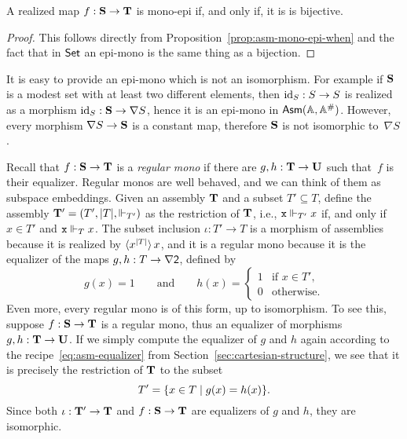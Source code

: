 \begin{corollary}
  A realized map $f : \mathbf{S} \to \mathbf{T}$ is mono-epi if, and only
  if, it is is bijective.
\end{corollary}

\begin{proof}
  This follows directly from Proposition~\ref{prop:asm-mono-epi-when}
  and the fact that in $\mathsf{Set}$ an epi-mono is the same thing as a
  bijection.
\end{proof}

It is easy to provide an epi-mono which is not an isomorphism. For
example if $\mathbf{S}$ is a modest set with at least two different
elements, then $\mathrm{id}_S : S \to S$ is realized as a morphism $\mathrm{id}_S :
\mathbf{S} \to \nabla S$, hence it is an epi-mono in $\mathsf{Asm}(\mathbb{A},\mathbb{A}^{\#})$. However,
every morphism $\nabla S \to \mathbf{S}$ is a constant map, therefore
$\mathbf{S}$ is not isomorphic to~$\nabla{S}$.

Recall that $f : \mathbf{S} \to \mathbf{T}$ is a \emph{regular mono} if
there are $g, h : \mathbf{T} \to \mathbf{U}$ such that~$f$ is their
equalizer. Regular monos are well behaved, and we can think of them as
subspace embeddings. Given an assembly $\mathbf{T}$ and a subset $T'
\subseteq T$, define the assembly $\mathbf{T}' = (T', |T|, {\Vdash_{T'}})$
as the restriction of $\mathbf{T}$, i.e., $\mathtt{x} \Vdash_{T'} x$ if, and only
if $x \in T'$ and $\mathtt{x} \Vdash_T x$. The subset inclusion $\iota : T'
\to T$ is a morphism of assemblies because it is realized by
$\langle x^{|T|} \rangle\,x$, and it is a regular mono because it is
the equalizer of the maps $g, h : T \to \nabla \mathsf{2}$, defined by
%
\begin{equation*}
  g(x) = 1
  \qquad\text{and}\qquad
  h(x) =
  \begin{cases}
    1 & \text{if $x \in T'$,}\\
    0 & \text{otherwise}.
  \end{cases}
\end{equation*}
%
Even more, every regular mono is of this form, up to isomorphism. To
see this, suppose $f : \mathbf{S} \to \mathbf{T}$ is a regular mono, thus an
equalizer of morphisms $g, h : \mathbf{T} \to \mathbf{U}$. If we simply
compute the equalizer of $g$ and $h$ again according to the
recipe~\eqref{eq:asm-equalizer} from
Section~\ref{sec:cartesian-structure}, we see that it is precisely the
restriction of $\mathbf{T}$ to the subset
% 
\begin{equation*}
  T' = \{x \in T \mid g(x) = h(x)\}.
\end{equation*}
% 
Since both $\iota : \mathbf{T}' \to \mathbf{T}$ and $f : \mathbf{S} \to
\mathbf{T}$ are equalizers of $g$ and $h$, they are isomorphic.

